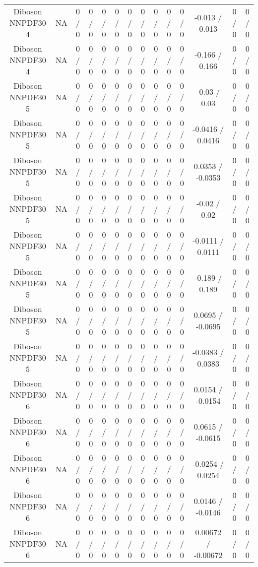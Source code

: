 \documentclass[10pt]{article}
\begin{document}
\begin{table}[htbp]
\begin{center}
\begin{tabular}{|c|c|c|c|c|c|c|c|c|c|c|c|c|c|}
  Diboson NNPDF30 4 &    NA    & 0 / 0 & 0 / 0 & 0 / 0 & 0 / 0 & 0 / 0 & 0 / 0 & 0 / 0 & 0 / 0 & 0 / 0 & -0.013 / 0.013 & 0 / 0 & 0 / 0 \\ 
  Diboson NNPDF30 4 &    NA    & 0 / 0 & 0 / 0 & 0 / 0 & 0 / 0 & 0 / 0 & 0 / 0 & 0 / 0 & 0 / 0 & 0 / 0 & -0.166 / 0.166 & 0 / 0 & 0 / 0 \\ 
  Diboson NNPDF30 5 &    NA    & 0 / 0 & 0 / 0 & 0 / 0 & 0 / 0 & 0 / 0 & 0 / 0 & 0 / 0 & 0 / 0 & 0 / 0 & -0.03 / 0.03 & 0 / 0 & 0 / 0 \\ 
  Diboson NNPDF30 5 &    NA    & 0 / 0 & 0 / 0 & 0 / 0 & 0 / 0 & 0 / 0 & 0 / 0 & 0 / 0 & 0 / 0 & 0 / 0 & -0.0416 / 0.0416 & 0 / 0 & 0 / 0 \\ 
  Diboson NNPDF30 5 &    NA    & 0 / 0 & 0 / 0 & 0 / 0 & 0 / 0 & 0 / 0 & 0 / 0 & 0 / 0 & 0 / 0 & 0 / 0 & 0.0353 / -0.0353 & 0 / 0 & 0 / 0 \\ 
  Diboson NNPDF30 5 &    NA    & 0 / 0 & 0 / 0 & 0 / 0 & 0 / 0 & 0 / 0 & 0 / 0 & 0 / 0 & 0 / 0 & 0 / 0 & -0.02 / 0.02 & 0 / 0 & 0 / 0 \\ 
  Diboson NNPDF30 5 &    NA    & 0 / 0 & 0 / 0 & 0 / 0 & 0 / 0 & 0 / 0 & 0 / 0 & 0 / 0 & 0 / 0 & 0 / 0 & -0.0111 / 0.0111 & 0 / 0 & 0 / 0 \\ 
  Diboson NNPDF30 5 &    NA    & 0 / 0 & 0 / 0 & 0 / 0 & 0 / 0 & 0 / 0 & 0 / 0 & 0 / 0 & 0 / 0 & 0 / 0 & -0.189 / 0.189 & 0 / 0 & 0 / 0 \\ 
  Diboson NNPDF30 5 &    NA    & 0 / 0 & 0 / 0 & 0 / 0 & 0 / 0 & 0 / 0 & 0 / 0 & 0 / 0 & 0 / 0 & 0 / 0 & 0.0695 / -0.0695 & 0 / 0 & 0 / 0 \\ 
  Diboson NNPDF30 5 &    NA    & 0 / 0 & 0 / 0 & 0 / 0 & 0 / 0 & 0 / 0 & 0 / 0 & 0 / 0 & 0 / 0 & 0 / 0 & -0.0383 / 0.0383 & 0 / 0 & 0 / 0 \\ 
  Diboson NNPDF30 6 &    NA    & 0 / 0 & 0 / 0 & 0 / 0 & 0 / 0 & 0 / 0 & 0 / 0 & 0 / 0 & 0 / 0 & 0 / 0 & 0.0154 / -0.0154 & 0 / 0 & 0 / 0 \\ 
  Diboson NNPDF30 6 &    NA    & 0 / 0 & 0 / 0 & 0 / 0 & 0 / 0 & 0 / 0 & 0 / 0 & 0 / 0 & 0 / 0 & 0 / 0 & 0.0615 / -0.0615 & 0 / 0 & 0 / 0 \\ 
  Diboson NNPDF30 6 &    NA    & 0 / 0 & 0 / 0 & 0 / 0 & 0 / 0 & 0 / 0 & 0 / 0 & 0 / 0 & 0 / 0 & 0 / 0 & -0.0254 / 0.0254 & 0 / 0 & 0 / 0 \\ 
  Diboson NNPDF30 6 &    NA    & 0 / 0 & 0 / 0 & 0 / 0 & 0 / 0 & 0 / 0 & 0 / 0 & 0 / 0 & 0 / 0 & 0 / 0 & 0.0146 / -0.0146 & 0 / 0 & 0 / 0 \\ 
  Diboson NNPDF30 6 &    NA    & 0 / 0 & 0 / 0 & 0 / 0 & 0 / 0 & 0 / 0 & 0 / 0 & 0 / 0 & 0 / 0 & 0 / 0 & 0.00672 / -0.00672 & 0 / 0 & 0 / 0 \\ 

\end{tabular}
\end{center}
\end{table}
\end{document}
